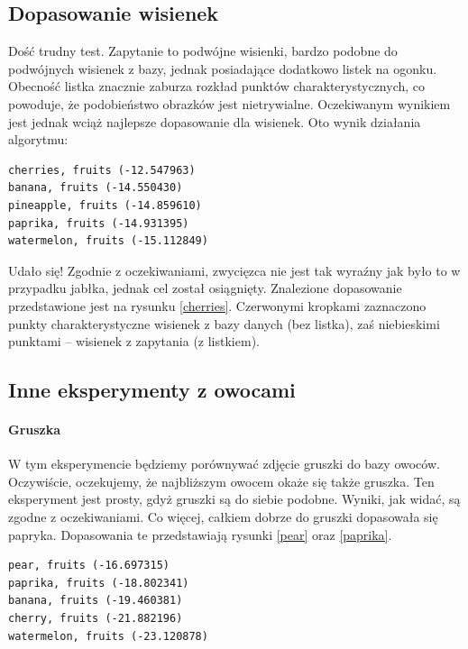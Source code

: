 \documentclass[a4paper,12pt,leqno]{article}
\begin{document}
\subsection{Dopasowanie wisienek}
Dość trudny test. Zapytanie to podwójne wisienki, bardzo podobne do podwójnych wisienek z bazy, jednak posiadające dodatkowo listek na ogonku. 
Obecność listka znacznie zaburza rozkład punktów charakterystycznych, co powoduje, że podobieństwo obrazków jest nietrywialne. Oczekiwanym
wynikiem jest jednak wciąż najlepsze dopasowanie dla wisienek. Oto wynik działania algorytmu:
\begin{verbatim}
cherries, fruits (-12.547963)
banana, fruits (-14.550430)
pineapple, fruits (-14.859610)
paprika, fruits (-14.931395)
watermelon, fruits (-15.112849)
\end{verbatim}
Udało się! Zgodnie z oczekiwaniami, zwycięzca nie jest tak wyraźny jak było to w przypadku jabłka, jednak cel został osiągnięty. Znalezione dopasowanie
przedstawione jest na rysunku \ref{cherries}. Czerwonymi kropkami zaznaczono punkty charakterystyczne wisienek z bazy danych (bez listka), zaś 
niebieskimi punktami -- wisienek z zapytania (z listkiem).

\subsection{Inne eksperymenty z owocami}

\paragraph{Gruszka}
W tym eksperymencie będziemy porównywać zdjęcie gruszki do bazy owoców. Oczywiście, oczekujemy, że najbliższym owocem okaże się także gruszka.
Ten eksperyment jest prosty, gdyż gruszki są do siebie podobne. Wyniki, jak widać, są zgodne z oczekiwaniami. Co więcej, całkiem dobrze do
gruszki dopasowała się papryka. Dopasowania te przedstawiają rysunki \ref{pear} oraz \ref{paprika}.
\begin{verbatim}
pear, fruits (-16.697315)
paprika, fruits (-18.802341)
banana, fruits (-19.460381)
cherry, fruits (-21.882196)
watermelon, fruits (-23.120878)
\end{verbatim}
\end{document}
